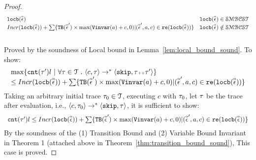 \begin{proof}
\[\begin{array}{ll}
  \mathtt{locb}(\stackrel{\scriptscriptstyle{\alpha}}{\mathtt{\epsilon}{}}) & \mathtt{locb}(\stackrel{\scriptscriptstyle{\alpha}}{\mathtt{\epsilon}{}}) \in \mathcal{SMBCST} \\
  Incr(\mathtt{locb}(\stackrel{\scriptscriptstyle{\alpha}}{\mathtt{\epsilon}{}})) + 
  \sum\{{\mathtt{TB}}(\stackrel{\scriptscriptstyle{\alpha}}{\mathtt{\epsilon}{}}') \times \max({\mathtt{Vinvar}}(a) + c, 0) | (\stackrel{\scriptscriptstyle{\alpha}}{\mathtt{\epsilon}{}}', a, c) \in \mathtt{re}(\mathtt{locb}(\stackrel{\scriptscriptstyle{\alpha}}{\mathtt{\epsilon}{}}))\} 
  & \mathtt{locb}(\stackrel{\scriptscriptstyle{\alpha}}{\mathtt{\epsilon}{}}) \notin \mathcal{SMBCST}
\end{array}
\]
  \caseL{$\locbound(\absevent) \in \constdom$}
  \\
  Proved by the soundness of Local bound in Lemma~\ref{lem:local_bound_sound}.
  \caseL{$\locbound(\absevent) \notin \constdom$}
To show:
\[
  \begin{array}{l}
    \max \left\{ \vcounter(\vtrace') l ~ \middle\vert~
\forall \vtrace \in \mathcal{T} \st \config{{c}, \trace} \to^{*} \config{\eskip, \trace\tracecat\vtrace'} \right\} 
\\
\leq 
Incr(\locbound(\absevent)) + 
\sum\{\absclr(\absevent') \times \max(\varinvar(a) + c, 0) | (\absevent', a, c) \in \reset(\locbound(\absevent))\} 
\end{array}
\]
  Taking an arbitrary initial trace
  $\mathtt{\tau}_0 \in \mathcal{T}$, 
  executing $c$ with $\mathtt{\tau}_0$, let $\mathtt{\tau}$ be the trace after evaluation, i.e., $\langle {c}, \mathtt{\tau}_0 \rangle \to^{*} \langle \mathtt{skip},\mathtt{\tau} \rangle$, it is sufficient to show:
  \[ 
    \begin{array}{l}
      \mathtt{cnt}(\mathtt{\tau}') l \leq 
    Incr(\mathtt{locb}(\stackrel{\scriptscriptstyle{\alpha}}{\mathtt{\epsilon}{}})) + 
    \sum\{{\mathtt{TB}}(\stackrel{\scriptscriptstyle{\alpha}}{\mathtt{\epsilon}{}}') \times \max({\mathtt{Vinvar}}(a) + c, 0) | (\stackrel{\scriptscriptstyle{\alpha}}{\mathtt{\epsilon}{}}', a, c) \in \mathtt{re}(\mathtt{locb}(\stackrel{\scriptscriptstyle{\alpha}}{\mathtt{\epsilon}{}}))\}
  \end{array}
  \]
%
 By the soundness of the (1) Transition Bound and (2) Variable Bound Invariant 
 in \cite{sinn2017complexity} Theorem 1 (attached above in Theorem~\ref{thm:transition_bound_sound}), 
This case is proved.
\end{proof}

